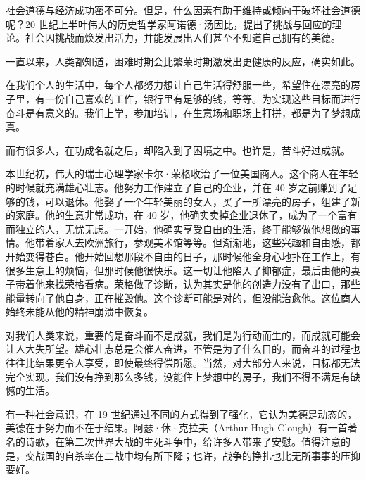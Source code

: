 社会道德与经济成功密不可分。但是，什么因素有助于维持或倾向于破坏社会道德呢？20 世纪上半叶伟大的历史哲学家阿诺德·汤因比，提出了挑战与回应的理论。社会因挑战而焕发出活力，并能发展出人们甚至不知道自己拥有的美德。

一直以来，人类都知道，困难时期会比繁荣时期激发出更健康的反应，确实如此。

在我们个人的生活中，每个人都努力想让自己生活得舒服一些，希望住在漂亮的房子里，有一份自己喜欢的工作，银行里有足够的钱，等等。为实现这些目标而进行奋斗是有意义的。我们上学，参加培训，在生意场和职场上打拼，都是为了梦想成真。

而有很多人，在功成名就之后，却陷入到了困境之中。也许是，苦斗好过成就。

本世纪初，伟大的瑞士心理学家卡尔·荣格收治了一位美国商人。这个商人在年轻的时候就充满雄心壮志。他努力工作建立了自己的企业，并在 40 岁之前赚到了足够的钱，可以退休。他娶了一个年轻美丽的女人，买了一所漂亮的房子，组建了新的家庭。他的生意非常成功，在 40 岁，他确实卖掉企业退休了，成为了一个富有而独立的人，无忧无虑。一开始，他确实享受自由的生活，终于能够做他想做的事情。他带着家人去欧洲旅行，参观美术馆等等。但渐渐地，这些兴趣和自由感，都开始变得苍白。他开始回想那段不自由的日子，那时候他全身心地扑在工作上，有很多生意上的烦恼，但那时候他很快乐。这一切让他陷入了抑郁症，最后由他的妻子带着他来找荣格看病。荣格做了诊断，认为其实是他的创造力没有了出口，那些能量转向了他自身，正在摧毁他。这个诊断可能是对的，但没能治愈他。这位商人始终未能从他的精神崩溃中恢复。

对我们人类来说，重要的是奋斗而不是成就，我们是为行动而生的，而成就可能会让人大失所望。雄心壮志总是会催人奋进，不管是为了什么目的，而奋斗的过程也往往比结果更令人享受，即使最终得偿所愿。当然，对大部分人来说，目标都无法完全实现。我们没有挣到那么多钱，没能住上梦想中的房子，我们不得不满足有缺憾的生活。

有一种社会意识，在 19 世纪通过不同的方式得到了强化，它认为美德是动态的，美德在于努力而不在于结果。阿瑟·休·克拉夫（Arthur Hugh Clough）有一首著名的诗歌，在第二次世界大战的生死斗争中，给许多人带来了安慰。值得注意的是，交战国的自杀率在二战中均有所下降；也许，战争的挣扎也比无所事事的压抑要好。

